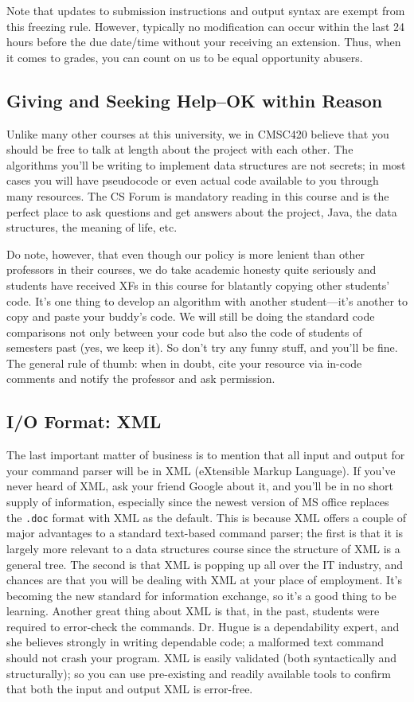\documentclass[12pt]{article}
\begin{document}
Note
that updates to submission instructions and output syntax are exempt
from this freezing rule. However, typically no modification can occur
within the last 24 hours before the due date/time without your
receiving an extension. Thus, when it comes to grades, you can count
on us to be equal opportunity abusers. 


\subsection{Giving and Seeking Help--OK within Reason}

Unlike many other courses at this university, we in CMSC420 believe
that you should be free to talk at length about the project with each
other.  The algorithms you'll be writing to implement data structures
are not secrets; in most cases you will have pseudocode or even actual
code available to you through many resources.  The CS Forum
is mandatory reading in this course and is the
perfect place to ask questions and get answers about the project,
Java, the data structures, the meaning of life, etc.  

 Do note, however, that even though our policy
is more lenient than other professors in their courses, we do take
academic honesty quite seriously and students have received XFs in
this course for blatantly copying other students' code.  It's one
thing to develop an algorithm with another student---it's another to
copy and paste your buddy's code.  We will still be doing the standard
code comparisons not only between your code but also the code of
students of semesters past (yes, we keep it).  So don't try any funny
stuff, and you'll be fine.  The general rule of thumb: when in doubt,
cite your resource via in-code comments and notify the professor and
ask permission. 

\subsection{I/O Format: XML}
The last important matter of business is to mention that all input and
output for your command parser will be in XML (eXtensible Markup
Language).  If you've never heard of XML, ask your friend Google about
it, and you'll be in no short supply of information, especially since
the newest version of MS office replaces the \texttt{.doc} format
with XML as the default. This is because  XML offers a
couple of major advantages to a standard text-based command parser;
the first is that it is largely more relevant to a data structures
course since the structure of XML is a general tree.  The second is
that XML is popping up all over the IT industry, and chances are that
you will be dealing with XML at your place of employment.  It's
becoming the new standard for information exchange, so it's a good
thing to be learning.  Another great thing about XML is that, in the
past, students were required to error-check the commands.  Dr.  Hugue
is a dependability expert, and she believes strongly in writing
dependable code; a malformed text command should not crash your
program.  XML is easily validated (both syntactically and
structurally); so you can use pre-existing and readily available tools
to confirm that both the input and output XML is error-free.
\end{document}
